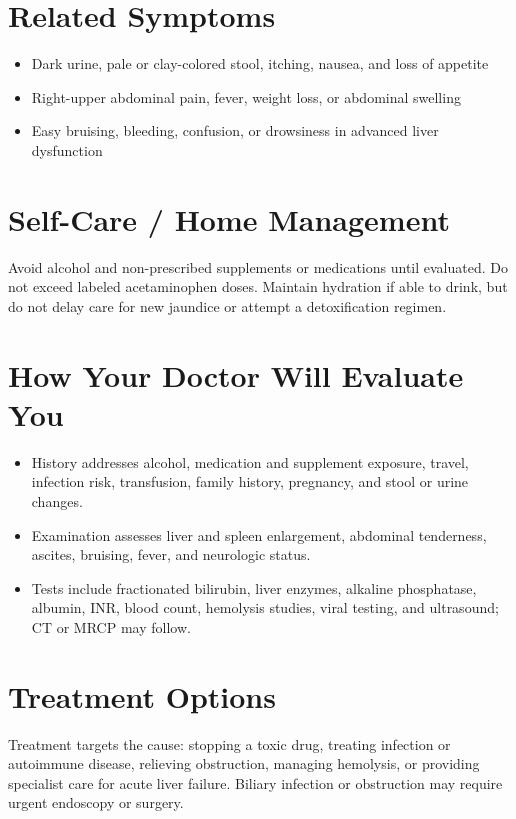 \section*{Related Symptoms}
\begin{itemize}
  \item Dark urine, pale or clay-colored stool, itching, nausea, and loss of appetite
  \item Right-upper abdominal pain, fever, weight loss, or abdominal swelling
  \item Easy bruising, bleeding, confusion, or drowsiness in advanced liver dysfunction
\end{itemize}

\section*{Self-Care / Home Management}
Avoid alcohol and non-prescribed supplements or medications until evaluated. Do not exceed labeled acetaminophen doses. Maintain hydration if able to drink, but do not delay care for new jaundice or attempt a detoxification regimen.

\section*{How Your Doctor Will Evaluate You}
\begin{itemize}
  \item History addresses alcohol, medication and supplement exposure, travel, infection risk, transfusion, family history, pregnancy, and stool or urine changes.
  \item Examination assesses liver and spleen enlargement, abdominal tenderness, ascites, bruising, fever, and neurologic status.
  \item Tests include fractionated bilirubin, liver enzymes, alkaline phosphatase, albumin, INR, blood count, hemolysis studies, viral testing, and ultrasound; CT or MRCP may follow.
\end{itemize}

\section*{Treatment Options}
Treatment targets the cause: stopping a toxic drug, treating infection or autoimmune disease, relieving obstruction, managing hemolysis, or providing specialist care for acute liver failure. Biliary infection or obstruction may require urgent endoscopy or surgery.

